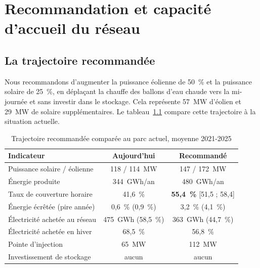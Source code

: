 \chapter[Recommandation et réseau]{Recommandation et capacité d'accueil du réseau}
\label{chap:reco}

\section{La trajectoire recommandée}
\label{sec:trajectoire}

Nous recommandons d'augmenter la puissance éolienne de 50~\% et la puissance solaire de 25~\%, en déplaçant la chauffe des ballons d'eau chaude vers la mi-journée et sans investir dans le stockage. Cela représente 57~MW d'éolien et 29~MW de solaire supplémentaires. Le tableau~\ref{tab:reco} compare cette trajectoire à la situation actuelle.

\begin{table}[H]
\centering
\footnotesize
\caption{Trajectoire recommandée comparée au parc actuel, moyenne 2021-2025}
\label{tab:reco}
{\renewcommand{\arraystretch}{1.2}
\begin{tabularx}{0.85\textwidth}{@{}>{\raggedright\arraybackslash}X cc@{}}
\toprule
\textbf{Indicateur} & \textbf{Aujourd'hui} & \textbf{Recommandé} \\
\midrule
Puissance solaire / éolienne & 118 / 114~MW & 147 / 172~MW \\
Énergie produite & 344~GWh/an & 480~GWh/an \\
Taux de couverture horaire & 41,6~\% & \textbf{55,4~\%} [51,5 ; 58,4] \\
Énergie écrêtée (pire année) & 0,6~\% (0,9~\%) & 3,2~\% (4,1~\%) \\
Électricité achetée au réseau & 475~GWh (58,5~\%) & 363~GWh (44,7~\%) \\
Électricité achetée en hiver & 68,5~\% & 56,8~\% \\
Pointe d'injection & 65~MW & 112~MW \\
Investissement de stockage & aucun & aucun \\
\bottomrule
\end{tabularx}}
\end{table}

